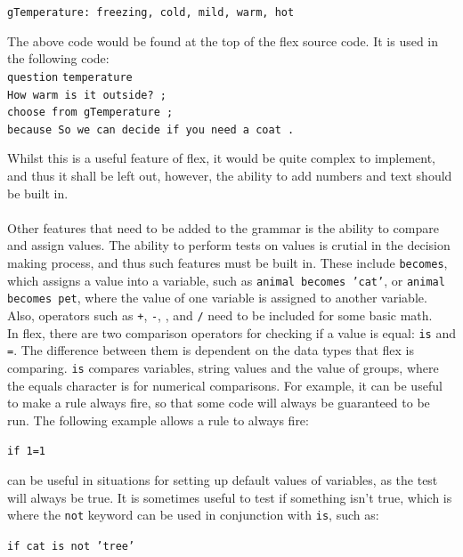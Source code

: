 \documentclass[12pt]{report}
\begin{document}
\texttt{gTemperature: freezing, cold, mild, warm, hot}\\
\begin{tabbing}
The above code would be found at the top of the flex source code.  It is used in the following code:\\
\texttt{question} \= \texttt{temperature}\\
\> \texttt{How warm is it outside? ;}\\
\> \texttt{choose from gTemperature ;}\\
\> \texttt{because So we can decide if you need a coat .}\\
\end{tabbing}
Whilst this is a useful feature of flex, it would be quite complex to implement, and thus it shall be left out, however, the ability to add numbers and text should be built in.
\\
\\
Other features that need to be added to the grammar is the ability to compare and assign values.  The ability to perform tests on values is crutial in the decision making process, and thus such features must be built in.  These include \texttt{becomes}, which assigns a value into a variable, such as \texttt{animal becomes 'cat'}, or \texttt{animal becomes pet}, where the value of one variable is assigned to another variable.  Also, operators such as \texttt{+}, \texttt{-}, \texttt{\*}, and \texttt{/} need to be included for some basic math.\\
In flex, there are two comparison operators for checking if a value is equal: \texttt{is} and \texttt{=}.  The difference between them is dependent on the data types that flex is comparing.  \texttt{is} compares variables, string values and the value of groups, where the equals character is for numerical comparisons.  For example, it can be useful to make a rule always fire, so that some code will always be guaranteed to be run.  The following example allows a rule to always fire:\\
\begin{center}
\texttt{if 1=1}
\end{center}
can be useful in situations for setting up default values of variables, as the test will always be true.  It is sometimes useful to test if something isn't true, which is where the \texttt{not} keyword can be used in conjunction with \texttt{is}, such as:\\
\begin{center}
\texttt{if cat is not 'tree'}\\
\end{center}
\end{document}

